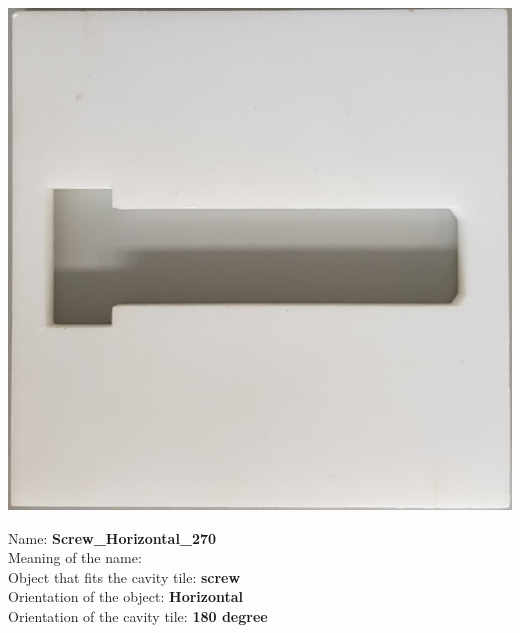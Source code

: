 \documentclass{article}
\begin{document}
\begin{minipage}[b]{0.35\linewidth}
\begin{center}
\includegraphics[height=5\baselineskip]{images/Screw_Horizontal_180.jpg}
\end{center}

\end{minipage}
\begin{minipage}[b]{0.65\linewidth}
\begin{flushleft}
Name: \textbf{Screw\_Horizontal\_270} \\ 
Meaning of the name: \\ 
Object that fits the cavity tile: \textbf{screw} \\
Orientation of the object: \textbf{Horizontal} \\
Orientation of the cavity tile:\textbf{ 180 degree}
\end{flushleft}

\end{minipage}
\end{document}
